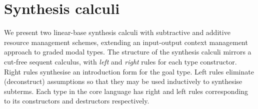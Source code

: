 


\section{Synthesis calculi}
\label{sec:core-synth-calculi}

We present two linear-base synthesis calculi with subtractive and additive resource
management schemes, extending an input-output context management approach to graded
modal types. The structure of the synthesis calculi mirrors a
cut-free sequent calculus, with
\textit{left} and \textit{right} rules for each type constructor. Right rules
synthesise an introduction form for the goal type. Left rules
eliminate (deconstruct) assumptions so that they may be
used inductively to synthesise subterms. Each type in the
core language has right and left
rules corresponding to its constructors and destructors respectively.

